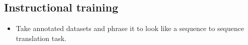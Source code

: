 \documentclass[11pt]{article}
\begin{document}




\subsection{Instructional training}

\begin{minipage}[l]{.5\linewidth}
    \begin{figure}[H]
        \centering
    \end{figure}    
\end{minipage}\hfill
\begin{minipage}[r]{.48\linewidth}
    \begin{itemize}
        \item Take annotated datasets and phrase it to look like a sequence to sequence translation task.
    \end{itemize}
\end{minipage}
\end{document}
